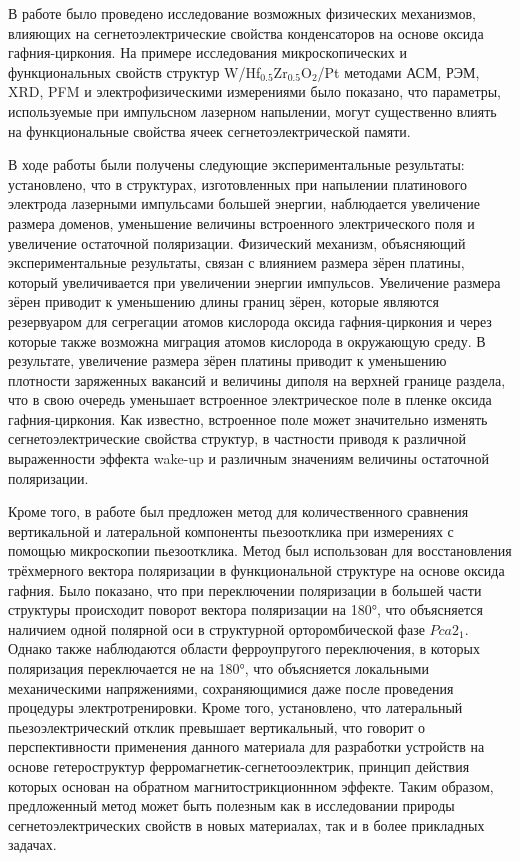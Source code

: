 В работе было проведено исследование возможных физических механизмов, влияющих на сегнетоэлектрические свойства конденсаторов на основе оксида гафния-циркония. На примере исследования микроскопических и функциональных свойств структур W/Hf\(_{0.5}\)Zr\(_{0.5}\)O\(_2\)/Pt методами АСМ, РЭМ, XRD, PFM и электрофизическими измерениями было показано, что параметры, используемые при импульсном лазерном напылении, могут существенно влиять на функциональные свойства ячеек сегнетоэлектрической памяти.

В ходе работы были получены следующие экспериментальные результаты: установлено, что в структурах, изготовленных при напылении платинового электрода лазерными импульсами большей энергии, наблюдается увеличение размера доменов, уменьшение величины встроенного электрического поля и увеличение остаточной поляризации. Физический механизм, объясняющий экспериментальные результаты, связан с влиянием размера зёрен платины, который увеличивается при увеличении энергии импульсов. Увеличение размера зёрен приводит к уменьшению длины границ зёрен, которые являются резервуаром для сегрегации атомов кислорода оксида гафния-циркония и через которые также возможна миграция атомов кислорода в окружающую среду. В результате, увеличение размера зёрен платины приводит к уменьшению плотности заряженных вакансий и величины диполя на верхней границе раздела, что в свою очередь уменьшает встроенное электрическое поле в пленке оксида гафния-циркония. Как известно, встроенное поле может значительно изменять сегнетоэлектрические свойства структур, в частности приводя к различной выраженности эффекта wake-up и различным значениям величины остаточной поляризации.

Кроме того, в работе был предложен метод для количественного сравнения вертикальной и латеральной компоненты пьезоотклика при измерениях с помощью микроскопии пьезоотклика. Метод был использован для восстановления трёхмерного вектора поляризации в функциональной структуре на основе оксида гафния. Было показано, что при переключении поляризации в большей части структуры происходит поворот вектора поляризации на \ang{180}, что объясняется наличием одной полярной оси в структурной орторомбической фазе \(Pca2_1\). Однако также наблюдаются области ферроупругого переключения, в которых поляризация переключается не на \ang{180}, что объясняется локальными механическими напряжениями, сохраняющимися даже после проведения процедуры электротренировки. Кроме того, установлено, что латеральный пьезоэлектрический отклик превышает вертикальный, что говорит о перспективности применения данного материала для разработки устройств на основе гетероструктур ферромагнетик-сегнетооэлектрик, принцип действия которых основан на обратном магнитострикционнном эффекте. Таким образом, предложенный метод может быть полезным как в исследовании природы сегнетоэлектрических свойств в новых материалах, так и в более прикладных задачах.

